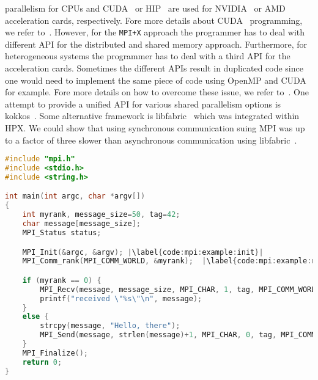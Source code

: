 parallelism for CPUs and CUDA\texttrademark~ or HIP\texttrademark{}~ are used for NVIDIA\texttrademark~ or AMD\texttrademark~ acceleration cards, respectively. Fore more details about CUDA\texttrademark{}~ programming, we refer to~\cite{sanders2010cuda}. However, for the \texttt{MPI+X} approach the programmer has to deal with different API for the distributed and shared memory approach. Furthermore, for heterogeneous systems the programmer has to deal with a third API for the acceleration cards. Sometimes the different APIs result in duplicated code since one would need to implement the same piece of code using OpenMP and CUDA for example. Fore more details on how to overcome these issue, we refer to~\cite{7543422}. One attempt to provide a unified API for various shared parallelism options is kokkos~\cite{10.1016/j.jpdc.2014.07.003}. Some alternative framework is libfabric~\cite{7312664} which was integrated within HPX. We could show that using synchronous communication suing MPI was up to a factor of three slower than asynchronous communication using libfabric~\cite{daiss2019piz}.


\begin{lstlisting}[language=c++,caption={Small Message Passing Interface example to send and receive messages.\label{code:mpi:example}},float,floatplacement=tb,escapechar=|]
#include "mpi.h"
#include <stdio.h>
#include <string.h>

int main(int argc, char *argv[])
{
    int myrank, message_size=50, tag=42;
    char message[message_size];
    MPI_Status status;

    MPI_Init(&argc, &argv); |\label{code:mpi:example:init}|
    MPI_Comm_rank(MPI_COMM_WORLD, &myrank);  |\label{code:mpi:example:rank}|

    if (myrank == 0) { 
        MPI_Recv(message, message_size, MPI_CHAR, 1, tag, MPI_COMM_WORLD, &status); |\label{code:mpi:example:receive}|
        printf("received \"%s\"\n", message);
    }
    else {
        strcpy(message, "Hello, there");
        MPI_Send(message, strlen(message)+1, MPI_CHAR, 0, tag, MPI_COMM_WORLD); |\label{code:mpi:example:send}|
    }
    MPI_Finalize();
    return 0;
}
\end{lstlisting}



